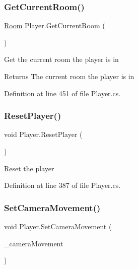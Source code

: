 \subsubsection{\texorpdfstring{Get\+Current\+Room()}{GetCurrentRoom()}}
{\footnotesize\ttfamily \mbox{\hyperlink{class_level_generation_1_1_room}{Room}} Player.\+Get\+Current\+Room (\begin{DoxyParamCaption}{ }\end{DoxyParamCaption})}



Get the current room the player is in 

\begin{DoxyReturn}{Returns}
The current room the player is in
\end{DoxyReturn}


Definition at line 451 of file Player.\+cs.

\mbox{\label{class_player_a89c5345d4267bf7902531407fe50c61e}} 
\subsubsection{\texorpdfstring{Reset\+Player()}{ResetPlayer()}}
{\footnotesize\ttfamily void Player.\+Reset\+Player (\begin{DoxyParamCaption}{ }\end{DoxyParamCaption})}



Reset the player 



Definition at line 387 of file Player.\+cs.

\mbox{\label{class_player_ae4848921e3458e9d0a2cde5acb63e165}} 
\subsubsection{\texorpdfstring{Set\+Camera\+Movement()}{SetCameraMovement()}}
{\footnotesize\ttfamily void Player.\+Set\+Camera\+Movement (\begin{DoxyParamCaption}\item[{\mbox{\hyperlink{class_camera_movement}{Camera\+Movement}}}]{\+\_\+camera\+Movement }\end{DoxyParamCaption})}



